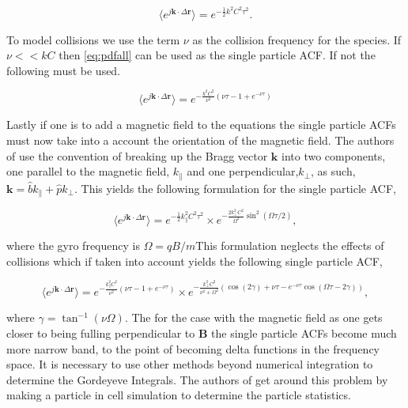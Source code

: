  \begin{equation}
\label{eq:pdfall}
\langle e^{j\mathbf{k}\cdot\Delta \mathbf{r}}\rangle= e^{-\frac{1}{2}k^2C^2 \tau^2}.
\end{equation}
 
 To model collisions we use the term $\nu$ as the collision frequency for the species. If $\nu<<kC$ then \ref{eq:pdfall} can be used as the single particle ACF. If not the following must be used.
 
 \begin{equation}
 \label{eq:colspacf}
 \langle e^{j\mathbf{k}\cdot\Delta \mathbf{r}}\rangle = e^{-\frac{k^2C^2}{\nu^2}\left( \nu \tau-1+e^{-\nu\tau}\right)}
 \end{equation}
 
Lastly if one is to add a magnetic field to the equations the single particle ACFs must now take into a account the orientation of the magnetic field. The authors of \citet{kudeki:milla:1} use the convention of breaking up the Bragg vector $\mathbf{k}$ into two components, one parallel to the magnetic field, $k_{\parallel}$ and one perpendicular,$k_{\perp}$, as such, $\mathbf{k}= \hat{b}k_{\parallel}+\hat{p}k_{\perp}$. This yields the following formulation for the single particle ACF,

 \begin{equation}
\label{eq:pdfmag}
\langle e^{j\mathbf{k}\cdot\Delta \mathbf{r}}\rangle= e^{-\frac{1}{2}k_{\parallel}^2C^2 \tau^2}\times e^{-\frac{2k_{\perp}^2C^2}{\Omega^2} \sin^2(\Omega\tau/2)},
\end{equation}

\noindent where the gyro frequency is $\Omega = qB/m$This formulation neglects the effects of collisions which if taken into account yields the following single particle ACF,

\begin{equation}
\label{eq:colspacf}
\langle e^{j\mathbf{k}\cdot\Delta \mathbf{r}}\rangle = e^{-\frac{k_\parallel^2C^2}{\nu^2}\left( \nu \tau-1+e^{-\nu\tau}\right)}\times e^{-\frac{k_\perp^2C^2}{\nu^2+\Omega^2}\left(\cos(2\gamma) + \nu \tau-e^{-\nu\tau}\cos(\Omega\tau-2\gamma)\right)},
\end{equation}
 
\noindent where $\gamma = \tan^{-1}(\nu\Omega)$. The for the case with the magnetic field as one gets closer to being fulling perpendicular to $\mathbf{B}$ the single particle ACFs become much more narrow band, to the point of becoming delta functions in the frequency space. It is necessary to use other methods beyond numerical integration to determine the Gordeyeve Integrals. The authors of \citet{kudeki:milla:2} get around this problem by making a particle in cell simulation to determine the particle statistics. 


